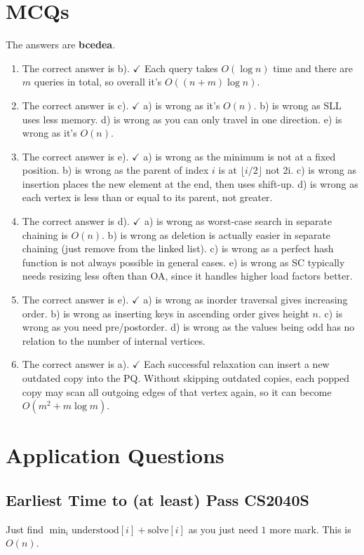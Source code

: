 \documentclass[12pt]{article}
\begin{document}
\section{MCQs}
The answers are \textbf{bcedea}.
\begin{enumerate}
\item The correct answer is b). $\checkmark$ Each query takes $O(\log n)$ time and there are $m$ queries in total, so overall it's $O((n+m)\log n)$.
\item The correct answer is c). $\checkmark$ a) is wrong as it's $O(n)$. b) is wrong as SLL uses less memory. d) is wrong as you can only travel in one direction. e) is wrong as it's $O(n)$.
\item The correct answer is e). $\checkmark$ a) is wrong as the minimum is not at a fixed position. b) is wrong as the parent of index $i$ is at $\lfloor i/2\rfloor$ not 2i. c) is wrong as insertion places the new element at the end, then uses shift-up. d) is wrong as each vertex is less than or equal to its parent, not greater.
\item The correct answer is d). $\checkmark$ a) is wrong as worst-case search in separate chaining is $O(n)$. b) is wrong as deletion is actually easier in separate chaining (just remove from the linked list). c) is wrong as a perfect hash function is not always possible in general cases. e) is wrong as SC typically needs resizing less often than OA, since it handles higher load factors better.
\item The correct answer is e). $\checkmark$ a) is wrong as inorder traversal gives increasing order. b) is wrong as inserting keys in ascending order gives height $n$. c) is wrong as you need pre/postorder. d) is wrong as the values being odd has no relation to the number of internal vertices.
\item The correct answer is a). $\checkmark$ Each successful relaxation can insert a new outdated copy into the PQ. Without skipping outdated copies, each popped copy may scan all outgoing edges of that vertex again, so it can become $O\left(m^2+m\log m\right)$.
\end{enumerate}
\section{Application Questions}
\subsection{Earliest Time to (at least) Pass CS2040S}
Just find $\min_i \mathrm{understood}[i]+\mathrm{solve}[i]$ as you just need $1$ more mark. This is $O(n)$.
\end{document}
